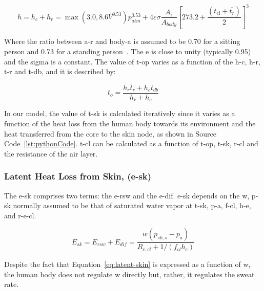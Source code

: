 
\begin{equation}
    h=h_{c} + h_{r} = \max(3.0, 8.6 V^{0.53}) p_{atm}^{0.53} + 4 \varepsilon \sigma \frac{A_{\mathrm{r}}}{A_{body}}\left[273.2+\frac{\left(t_{\mathrm{cl}}+\overline{t_{r}}\right)}{2}\right]^{3}\label{eq:h}
\end{equation}

Where the ratio between \ac{a-r} and \ac{body-a} is assumed to be 0.70 for a sitting person and 0.73 for a standing person~\cite{Fanger1967}.
The \ac{e} is close to unity (typically 0.95) and the \ac{sigma} is a constant.
The value of \ac{t-op} varies as a function of the \ac{h-c}, \ac{h-r}, \ac{t-r} and \ac{t-db}, and it is described by:

\begin{equation}
    t_{o}=\frac{h_{r} \bar{t}_{r}+h_{c} t_{db}}{h_{r}+h_{c}}\label{eq:t-op}
\end{equation}

In our model, the value of \ac{t-sk} is calculated iteratively since it varies as a function of the heat loss from the human body towards its environment and the heat transferred from the core to the skin node, as shown in Source Code~\ref{lst:pythonCode}.
\Ac{t-cl} can be calculated as a function of \ac{t-op}, \ac{t-sk}, \ac{r-cl} and the resistance of the air layer.

\subsubsection{Latent Heat Loss from Skin, (\acs{e-sk})}

The \acf{e-sk} comprises two terms: the \ac{e-rsw} and the \ac{e-dif}.
\ac{e-sk} depends on the \ac{w}, \ac{p-sk} normally assumed to be that of saturated water vapor at \ac{t-sk}, \ac{p-a}, \ac{f-cl}, \ac{h-e}, and \ac{r-e-cl}.

\begin{equation}
    E_{s k}=E_{rsw}+E_{dif}=\frac{w\left(p_{s k, s}-p_{a}\right)}{R_{e, c l}+1 /\left(f_{c l} h_{e}\right)}\label{eq:latent-skin}
\end{equation}

Despite the fact that Equation~\ref{eq:latent-skin} is expressed as a function of \ac{w}, the human body does not regulate \ac{w} directly but, rather, it regulates the sweat rate.

